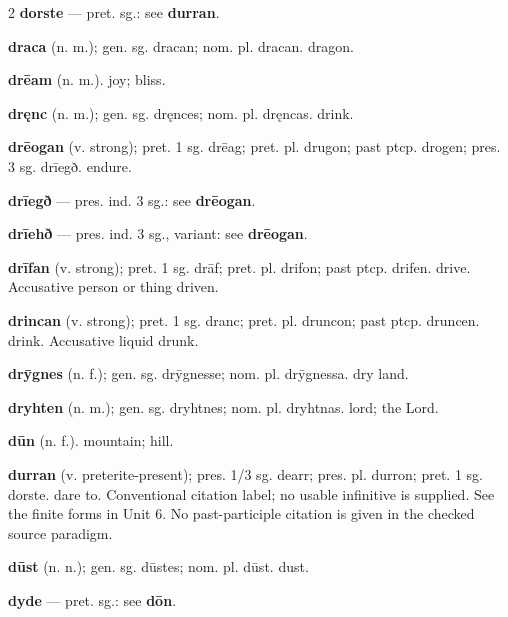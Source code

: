 \begin{multicols*}{2}
\textbf{dorste} — pret. sg.: see \textbf{durran}.\par
\textbf{draca} (n. m.); gen. sg. dracan; nom. pl. dracan. dragon.\par
\textbf{drēam} (n. m.). joy; bliss.\par
\textbf{dręnc} (n. m.); gen. sg. dręnces; nom. pl. dręncas. drink.\par
\textbf{drēogan} (v. strong); pret. 1 sg. drēag; pret. pl. drugon; past ptcp. drogen; pres. 3 sg. drīegð. endure.\par
\textbf{drīegð} — pres. ind. 3 sg.: see \textbf{drēogan}.\par
\textbf{drīehð} — pres. ind. 3 sg., variant: see \textbf{drēogan}.\par
\textbf{drīfan} (v. strong); pret. 1 sg. drāf; pret. pl. drifon; past ptcp. drifen. drive. Accusative person or thing driven.\par
\textbf{drincan} (v. strong); pret. 1 sg. dranc; pret. pl. druncon; past ptcp. druncen. drink. Accusative liquid drunk.\par
\textbf{drȳgnes} (n. f.); gen. sg. drȳgnesse; nom. pl. drȳgnessa. dry land.\par
\textbf{dryhten} (n. m.); gen. sg. dryhtnes; nom. pl. dryhtnas. lord; the Lord.\par
\textbf{dūn} (n. f.). mountain; hill.\par
\textbf{durran} (v. preterite-present); pres. 1/3 sg. dearr; pres. pl. durron; pret. 1 sg. dorste. dare to. Conventional citation label; no usable infinitive is supplied. See the finite forms in Unit 6. No past-participle citation is given in the checked source paradigm.\par
\textbf{dūst} (n. n.); gen. sg. dūstes; nom. pl. dūst. dust.\par
\textbf{dyde} — pret. sg.: see \textbf{dōn}.\par

\end{multicols*}

